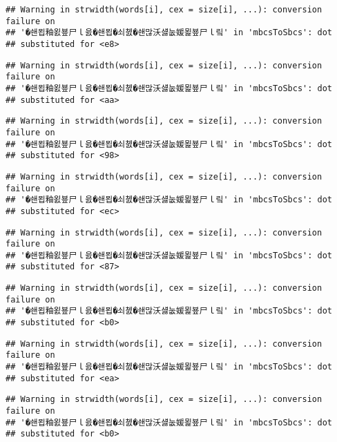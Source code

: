 \documentclass[]{article}
\begin{document}
\begin{verbatim}
## Warning in strwidth(words[i], cex = size[i], ...): conversion failure on
## '�쇈묍釉욄뵾尸ｌ읈�쇈묍�쇠쳸�쇈많沃섏눖媛묉뵾尸ｌ맄' in 'mbcsToSbcs': dot
## substituted for <e8>
\end{verbatim}

\begin{verbatim}
## Warning in strwidth(words[i], cex = size[i], ...): conversion failure on
## '�쇈묍釉욄뵾尸ｌ읈�쇈묍�쇠쳸�쇈많沃섏눖媛묉뵾尸ｌ맄' in 'mbcsToSbcs': dot
## substituted for <aa>
\end{verbatim}

\begin{verbatim}
## Warning in strwidth(words[i], cex = size[i], ...): conversion failure on
## '�쇈묍釉욄뵾尸ｌ읈�쇈묍�쇠쳸�쇈많沃섏눖媛묉뵾尸ｌ맄' in 'mbcsToSbcs': dot
## substituted for <98>
\end{verbatim}

\begin{verbatim}
## Warning in strwidth(words[i], cex = size[i], ...): conversion failure on
## '�쇈묍釉욄뵾尸ｌ읈�쇈묍�쇠쳸�쇈많沃섏눖媛묉뵾尸ｌ맄' in 'mbcsToSbcs': dot
## substituted for <ec>
\end{verbatim}

\begin{verbatim}
## Warning in strwidth(words[i], cex = size[i], ...): conversion failure on
## '�쇈묍釉욄뵾尸ｌ읈�쇈묍�쇠쳸�쇈많沃섏눖媛묉뵾尸ｌ맄' in 'mbcsToSbcs': dot
## substituted for <87>
\end{verbatim}

\begin{verbatim}
## Warning in strwidth(words[i], cex = size[i], ...): conversion failure on
## '�쇈묍釉욄뵾尸ｌ읈�쇈묍�쇠쳸�쇈많沃섏눖媛묉뵾尸ｌ맄' in 'mbcsToSbcs': dot
## substituted for <b0>
\end{verbatim}

\begin{verbatim}
## Warning in strwidth(words[i], cex = size[i], ...): conversion failure on
## '�쇈묍釉욄뵾尸ｌ읈�쇈묍�쇠쳸�쇈많沃섏눖媛묉뵾尸ｌ맄' in 'mbcsToSbcs': dot
## substituted for <ea>
\end{verbatim}

\begin{verbatim}
## Warning in strwidth(words[i], cex = size[i], ...): conversion failure on
## '�쇈묍釉욄뵾尸ｌ읈�쇈묍�쇠쳸�쇈많沃섏눖媛묉뵾尸ｌ맄' in 'mbcsToSbcs': dot
## substituted for <b0>
\end{verbatim}
\end{document}
